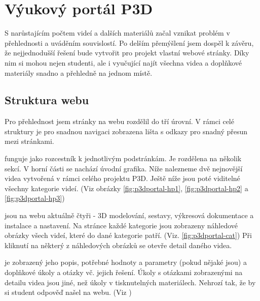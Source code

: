 \section{Výukový portál P3D}
S narůstajícím počtem videí a dalších materiálů začal vznikat problém v přehlednosti a uváděním souvislostí.
Po delším přemýšlení jsem dospěl k závěru, že nejjednodušší řešení bude vytvořit pro projekt vlastní webové stránky.
Díky nim si mohou nejen studenti, ale i vyučující najít všechna videa a doplňkové materiály snadno a přehledně na jednom místě.

\subsection{Struktura webu}
Pro přehlednost jsem stránky na webu rozdělil do tří úrovní. 
V rámci celé struktury je pro snadnou navigaci zobrazena lišta s odkazy pro snadný přesun mezi stránkami.

\noindent{} funguje jako rozcestník k jednotlivým podstránkám. Je rozdělena na několik sekcí. V horní části se nachází úvodní grafika. Níže nalezneme dvě nejnovější videa vytvořená v rámci celého projektu P3D. Ještě níže jsou poté viditelné všechny kategorie videí. (Viz obrázky \ref{fig:p3dportal-hp1}, \ref{fig:p3dportal-hp2} a \ref{fig:p3dportal-hp3})

\noindent{} jsou na webu aktuálně čtyři - 3D modelování, sestavy, výkresová dokumentace a instalace a nastavení. Na stránce každé kategorie jsou zobrazeny náhledové obrázky všech videí, které do dané kategorie patří. (Viz. \autoref{fig:p3dportal-cat})
Při kliknutí na některý z náhledových obrázků se otevře detail daného videa. 

\noindent{} je zobrazený jeho popis, potřebné hodnoty a parametry (pokud nějaké jsou) a doplňkové úkoly a otázky vč. jejich řešení. Úkoly s otázkami zobrazenými na detailu videa jsou jiné, než úkoly v tisknutelných materiálech. Nehrozí tak, že by si student odpověď našel na webu. (Viz )

\noindent

